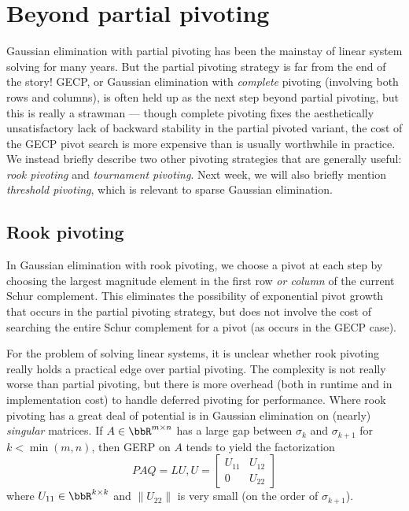 \section{Beyond partial pivoting}

Gaussian elimination with partial pivoting has been the mainstay of
linear system solving for many years.  But the partial pivoting
strategy is far from the end of the story!  GECP, or Gaussian elimination
with {\em complete} pivoting (involving both rows and columns),
is often held up as the next step beyond partial pivoting,
but this is really a strawman --- though complete pivoting fixes
the aesthetically unsatisfactory lack of backward stability in the
partial pivoted variant, the cost of the GECP pivot search is
more expensive than is usually worthwhile in practice.  We instead
briefly describe two other pivoting strategies that are generally
useful: {\em rook pivoting} and {\em tournament pivoting}.  Next week,
we will also briefly mention {\em threshold pivoting}, which is relevant
to sparse Gaussian elimination.

\subsection{Rook pivoting}

In Gaussian elimination with rook pivoting, we choose a pivot at each
step by choosing the largest magnitude element in the first row
{\em or column} of the current Schur complement.  This eliminates
the possibility of exponential pivot growth that occurs in the
partial pivoting strategy, but does not involve the cost of searching
the entire Schur complement for a pivot (as occurs in the GECP case).

For the problem of solving linear systems, it is unclear whether rook
pivoting really holds a practical edge over partial pivoting.  The
complexity is not really worse than partial pivoting, but there is more
overhead (both in runtime and in implementation cost) to handle deferred
pivoting for performance.  Where rook pivoting has a great deal of
potential is in Gaussian elimination on (nearly) {\em singular} matrices.
If $A \in \bbR^{m \times n}$ has a large gap between $\sigma_{k}$
and $\sigma_{k+1}$ for $k < \min(m,n)$, then GERP on $A$ tends to yield
the factorization
\[
  PAQ = LU, U = \begin{bmatrix} U_{11} & U_12 \\ 0 & U_{22} \end{bmatrix}
\]
where $U_{11} \in \bbR^{k \times k}$ and $\|U_{22}\|$ is very small
(on the order of $\sigma_{k+1}$).

